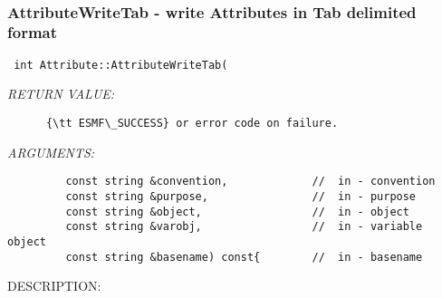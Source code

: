  
\setlength{\oldparskip}{\parskip}
\setlength{\parskip}{1.5ex}
\setlength{\oldparindent}{\parindent}
\setlength{\parindent}{0pt}
\setlength{\oldbaselineskip}{\baselineskip}
\setlength{\baselineskip}{11pt}
 
\def\bv{\begin{verbatim}}
\def\ev{\end{verbatim}}
\def\be{\begin{equation}}
\def\ee{\end{equation}}
\def\bea{\begin{eqnarray}}
\def\eea{\end{eqnarray}}
\def\bi{\begin{itemize}}
\def\ei{\end{itemize}}
\def\bn{\begin{enumerate}}
\def\en{\end{enumerate}}
\def\bd{\begin{description}}
\def\ed{\end{description}}
\def\({\left (}
\def\){\right )}
\def\[{\left [}
\def\]{\right ]}
\def\<{\left  \langle}
\def\>{\right \rangle}
\def\cI{{\cal I}}
\def\diag{\mathop{\rm diag}}
\def\tr{\mathop{\rm tr}}


 

  
 
\mbox{}\hrulefill\
 
\subsubsection [AttributeWriteTab] {AttributeWriteTab - write Attributes in Tab delimited format}


  
\begin{verbatim} int Attribute::AttributeWriteTab(\end{verbatim}{\em RETURN VALUE:}
\begin{verbatim}      {\tt ESMF\_SUCCESS} or error code on failure.\end{verbatim}{\em ARGUMENTS:}
\begin{verbatim}         const string &convention,             //  in - convention
         const string &purpose,                //  in - purpose
         const string &object,                 //  in - object
         const string &varobj,                 //  in - variable object
         const string &basename) const{        //  in - basename\end{verbatim}
{\sf DESCRIPTION:\\ }


